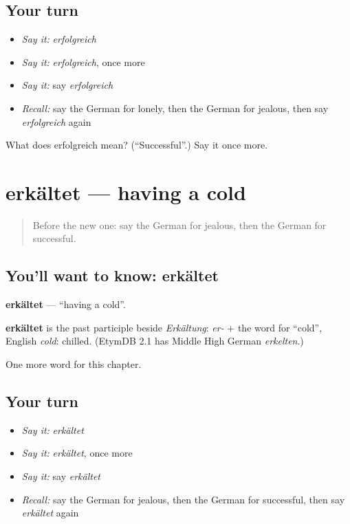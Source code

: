 \subsection*{Your turn}
\begin{itemize}
\raggedright
  \item \emph{Say it:} \emph{erfolgreich}
  \item \emph{Say it:} \emph{erfolgreich}, once more
  \item \emph{Say it:} say \emph{erfolgreich}
  \item \emph{Recall:} say the German for lonely, then the German for jealous, then say \emph{erfolgreich} again
\end{itemize}

\begin{tcolorbox}[breakable,colback=teal!4,colframe=teal!35!black,title={Before you move on}]
What does erfolgreich mean? (\textquotedblleft{}Successful\textquotedblright{}.) Say it once more.
\end{tcolorbox}
\section[erkältet]{erkältet — having a cold}

\label{lesson:GE-C213-erkaeltet}



\begin{quote}
Before the new one: say the German for jealous, then the German for successful.
\end{quote}

\subsection*{You'll want to know: erkältet}
\textbf{erkältet} — \textquotedblleft{}having a cold\textquotedblright{}.

\begin{cousinweb}
\textbf{erkältet} is the past participle beside \emph{Erkältung}: \emph{er-} + the word for \textquotedblleft{}cold\textquotedblright{}, English \emph{cold}: chilled. (EtymDB 2.1 has Middle High German \emph{erkelten}.)
\end{cousinweb}

\begin{grammarlens}[title={What you've built}]
One more word for this chapter.
\end{grammarlens}

\subsection*{Your turn}
\begin{itemize}
\raggedright
  \item \emph{Say it:} \emph{erkältet}
  \item \emph{Say it:} \emph{erkältet}, once more
  \item \emph{Say it:} say \emph{erkältet}
  \item \emph{Recall:} say the German for jealous, then the German for successful, then say \emph{erkältet} again
\end{itemize}

